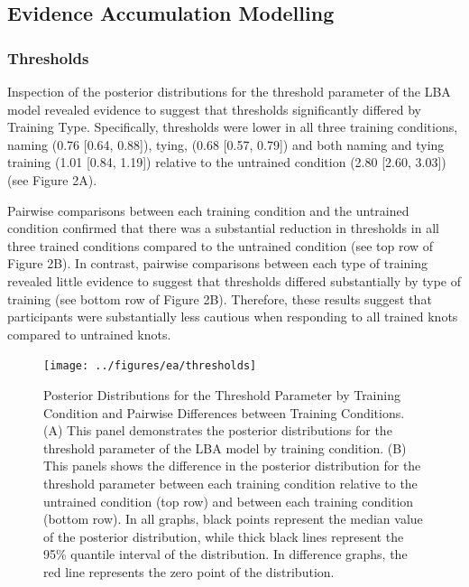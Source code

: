 \documentclass[
  man, donotrepeattitle,floatsintext]{apa6}
\begin{document}
\subsection{Evidence Accumulation Modelling}\label{evidence-accumulation-modelling}

\subsubsection{Thresholds}\label{thresholds}

Inspection of the posterior distributions for the threshold parameter of the LBA model revealed evidence to suggest that thresholds significantly differed by Training Type. Specifically, thresholds were lower in all three training conditions, naming (0.76 {[}0.64, 0.88{]}), tying, (0.68 {[}0.57, 0.79{]}) and both naming and tying training (1.01 {[}0.84, 1.19{]}) relative to the untrained condition (2.80 {[}2.60, 3.03{]}) (see Figure 2A).

Pairwise comparisons between each training condition and the untrained condition confirmed that there was a substantial reduction in thresholds in all three trained conditions compared to the untrained condition (see top row of Figure 2B). In contrast, pairwise comparisons between each type of training revealed little evidence to suggest that thresholds differed substantially by type of training (see bottom row of Figure 2B). Therefore, these results suggest that participants were substantially less cautious when responding to all trained knots compared to untrained knots.



\begin{figure}[H]

{\centering \texttt{[image: ../figures/ea/thresholds]} 

}

\caption{Posterior Distributions for the Threshold Parameter by Training Condition and Pairwise Differences between Training Conditions. (A) This panel demonstrates the posterior distributions for the threshold parameter of the LBA model by training condition. (B) This panels shows the difference in the posterior distribution for the threshold parameter between each training condition relative to the untrained condition (top row) and between each training condition (bottom row). In all graphs, black points represent the median value of the posterior distribution, while thick black lines represent the 95\% quantile interval of the distribution. In difference graphs, the red line represents the zero point of the distribution.}\label{fig:threshold-plot}
\end{figure}
\end{document}
